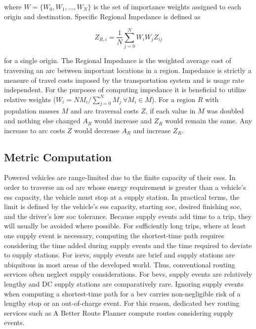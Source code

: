 \documentclass[11pt]{article}
\begin{document}
\begin{multicols}{2}
\noindent where $W = \{W_0, W_1, \dots, W_N\}$ is the set of importance weights assigned to each origin and destination. Specific Regional Impedance is defined as

\begin{equation}
	Z_{R,i} = \frac{1}{N}\sum_{j = 0 }^{N} W_iW_jZ_{ij} \label{eq:specific_regional_impedance}
\end{equation}

for a single origin. The Regional Impedance is the weighted average cost of traversing an arc between important locations in a region. Impedance is strictly a measure of travel costs imposed by the transportation system and is usage rate independent. For the purposes of computing impedance it is beneficial to utilize relative weights ($W_i = NM_i / \sum_{j = 0}^{N} M_j\ \forall M_i \in M$). For a region $R$ with population masses $M$ and arc traversal costs $Z$, if each value in $M$ was doubled and nothing else changed $A_R$ would increase and $Z_R$ would remain the same. Any increase to arc costs $Z$ would decrease $A_R$ and increase $Z_R$.

\subsection*{Metric Computation}

Powered vehicles are range-limited due to the finite capacity of their \glspl{ess}. In order to traverse an \gls{od} arc whose energy requirement is greater than a vehicle's \gls{ess} capacity, the vehicle must stop at a supply station. In practical terms, the limit is defined by the vehicle's \gls{ess} capacity, starting \gls{soc}, desired finishing \gls{soc}, and the driver's low \gls{soc} tolerance. Because supply events add time to a trip, they will usually be avoided where possible. For sufficiently long trips, where at least one supply event is necessary, computing the shortest-time path requires considering the time added during supply events and the time required to deviate to supply stations. For \glspl{icev}, supply events are brief and supply stations are ubiquitous in most areas of the developed world. Thus, conventional routing services often neglect supply considerations. For \glspl{bev}, supply events are relatively lengthy and DC supply stations are comparatively rare. Ignoring supply events when computing a shortest-time path for a \gls{bev} carries non-negligible risk of a lengthy stop or an out-of-charge event. For this reason, dedicated \gls{bev} routing services such as A Better Route Planner compute routes considering supply events.


\end{multicols}
\end{document}
